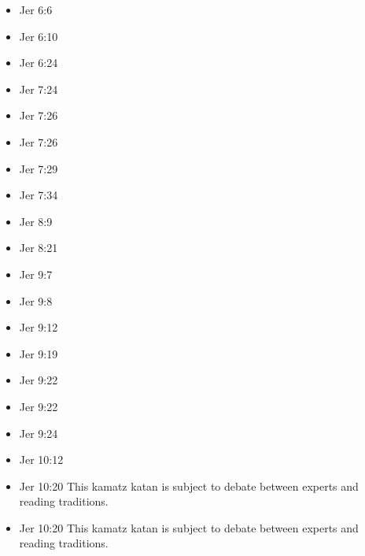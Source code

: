\documentclass[14pt]{book}
\begin{document}
\begin{multicols}{2}
\begin{itemize}
						\item Jer 6:6
						
						\item Jer 6:10
						
						\item Jer 6:24
						
						\item Jer 7:24
						
						\item Jer 7:26
						
						\item Jer 7:26
						
						\item Jer 7:29
						
						\item Jer 7:34
						
						\item Jer 8:9
						
						\item Jer 8:21
						
						\item Jer 9:7
						
						\item Jer 9:8
						
						\item Jer 9:12
						
						\item Jer 9:19
						
						\item Jer 9:22
						
						\item Jer 9:22
						
						\item Jer 9:24
						
						\item Jer 10:12
						
						\item Jer 10:20 This kamatz katan is subject to debate between experts and reading traditions.
						
						\item Jer 10:20 This kamatz katan is subject to debate between experts and reading traditions.
						

\end{itemize}
\end{multicols}
\end{document}
